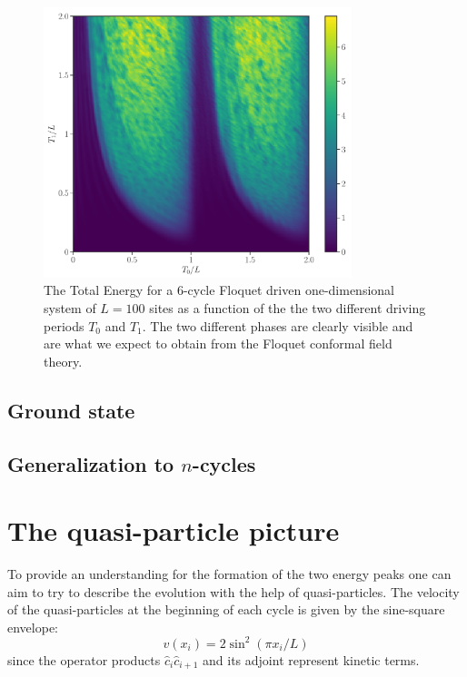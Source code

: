 \documentclass[11pt, a4paper]{article}
\theoremstyle{definition} %
\begin{document}
\begin{figure}[h]
	\centering
	\includegraphics[width=0.8\textwidth]{PhaseDiagram}
	\caption{The Total Energy for a 6-cycle Floquet driven one-dimensional system of $L = 100$ sites as a function of the the two different driving periods $T_0$ and $T_1$. The two different phases are clearly visible and are what we expect to obtain from the Floquet conformal field theory.}
\end{figure}

\subsection{Ground state}





\subsection{Generalization to $n$-cycles}

\section{The quasi-particle picture}
To provide an understanding for the formation of the two energy peaks one can aim to try to describe the evolution with the help of quasi-particles. The velocity of the quasi-particles at the beginning of each cycle is given by the sine-square envelope:
\begin{equation}
	v(x_i) = 2\sin^2(\pi x_i/L)
\end{equation}
since the operator products $\hat{c}_i \hat{c}_{i+1}$ and its adjoint represent kinetic terms.
\end{document}
